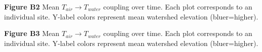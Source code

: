 \documentclass[notitlepage]{article}
\begin{document}
\begin{center}
\textbf{Figure B2} Mean $T_{air}\rightarrow T_{water}$ coupling over time. Each plot corresponds to an individual site. Y-label colors represent mean watershed elevation (bluer=higher).
\end{center}

\begin{center}
\textbf{Figure B3} Mean $T_{air}\rightarrow T_{water}$ coupling over time. Each plot corresponds to an individual site. Y-label colors represent mean watershed elevation (bluer=higher).
\end{center}
\end{document}
